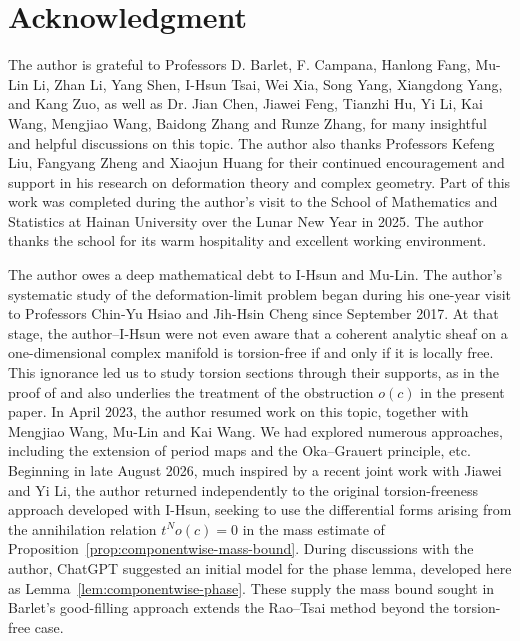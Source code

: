 \documentclass[11pt]{amsart}
\numberwithin{equation}{section}
\theoremstyle{plain}
\theoremstyle{definition}
\begin{document}
\section*{Acknowledgment}
The author is grateful to Professors D. Barlet, F. Campana, Hanlong Fang, Mu-Lin Li, Zhan Li, Yang Shen,  
I-Hsun Tsai, Wei Xia, Song Yang, Xiangdong Yang, and Kang Zuo, as well as
Dr. Jian Chen, Jiawei Feng, Tianzhi Hu, Yi Li, Kai Wang, Mengjiao Wang,
Baidong Zhang and Runze Zhang, for many insightful and helpful discussions on this
topic.  The author also thanks Professors Kefeng Liu, Fangyang Zheng and Xiaojun Huang 
for their continued encouragement and support in his research on
deformation theory and complex geometry.  Part of this work was completed during the author's visit to the School
of Mathematics and Statistics at Hainan University over the Lunar New
Year in 2025.  The author thanks the school for its warm hospitality
and excellent working environment.





The author owes a deep mathematical debt to I-Hsun and Mu-Lin. The author's systematic study of the deformation-limit problem began
during his one-year visit to Professors Chin-Yu Hsiao and Jih-Hsin Cheng since September 2017.  At that stage, the author--I-Hsun were not even aware that a coherent analytic sheaf on a one-dimensional
complex manifold is torsion-free if and only if it is locally free.
This ignorance led us to study torsion sections through their supports, as in
the proof of \cite[Proposition~4.5]{RT21} and also underlies
the treatment of the obstruction $o(c)$ in the present paper. In April 2023, the author resumed work on this topic,  together with Mengjiao Wang, Mu-Lin and
Kai Wang. We had explored numerous
approaches, including the extension of period maps and the
Oka--Grauert principle, etc.
Beginning in late August 2026, much inspired by a recent joint work with Jiawei and Yi Li, the author returned independently to the original
torsion-freeness approach developed with I-Hsun, seeking to use
the differential forms arising from the annihilation relation
$t^No(c)=0$ in the mass estimate of
Proposition~\ref{prop:componentwise-mass-bound}.
During discussions with the author, ChatGPT suggested an initial model
for the phase lemma, developed here as
Lemma~\ref{lem:componentwise-phase}.  These supply the mass bound
sought in Barlet's good-filling approach \cite{Ba15} extends the Rao--Tsai
method beyond the torsion-free case.
\end{document}
